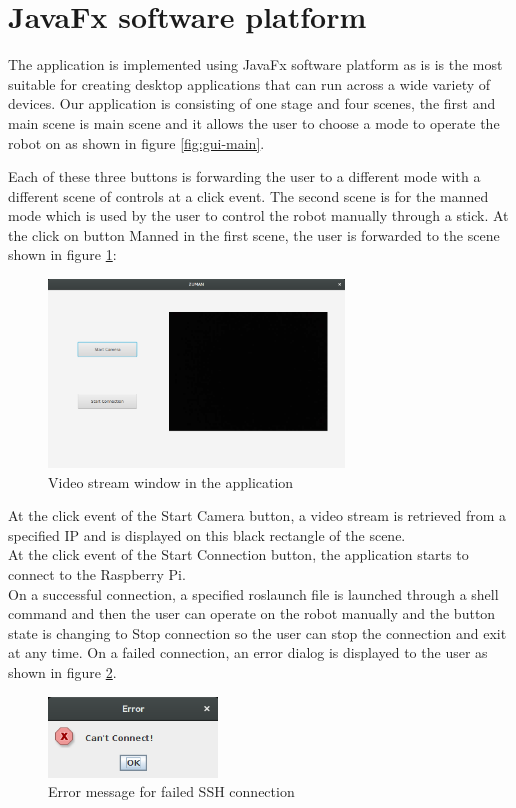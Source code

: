 \documentclass[12pt]{book}
\begin{document}
\section{JavaFx software platform}
The application is implemented using JavaFx software platform as is is the most suitable for creating
desktop applications that can run across a wide variety of devices.
Our application is consisting of one stage and four scenes, the first and main scene is main scene and it
allows the user to choose a mode to operate the robot on as shown in figure \ref{fig:gui-main}.

Each of these three buttons is forwarding the user to a different mode with a different scene of controls at a click event.
The second scene is for the manned mode which is used by the user to control the robot manually through a stick.
At the click on button Manned in the first scene, the user is forwarded to the scene shown in figure \ref{fig:camera-scene}:

\begin{figure}
	\centering
	\includegraphics[width =0.7\textwidth]{Fig/camera-scene.png}
	\caption{Video stream window in the application}
	\label{fig:camera-scene}
\end{figure}

\noindent At the click event of the Start Camera button, a video stream is retrieved from a specified IP and is displayed on this black rectangle of the scene.\\

\noindent At the click event of the Start Connection button, the application starts to connect to the Raspberry Pi.\\
On a successful connection, a specified roslaunch file is launched through a shell command and then the user can operate on the robot manually and the button state is changing to Stop connection so the user can stop the connection and exit at any time. On a failed connection, an error dialog is displayed to the user as shown in figure \ref{fig:error-window}.
\begin{figure}
	\centering
	\includegraphics[width =0.4\textwidth]{Fig/error-window.png}
	\caption{Error message for failed SSH connection}
	\label{fig:error-window}
\end{figure}
\end{document}
